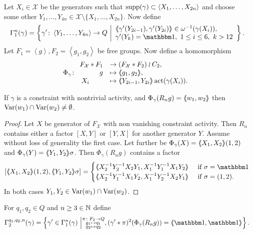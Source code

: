 \documentclass[a4paper,11pt]{amsart}
\begin{document}
 Let $X_i\in\mathcal{X}$ be the generators such that
 $\operatorname{{supp}}(\gamma) \subset \left<X_1,\dotsc,X_{2n}\right>$ and choose
 some other
 $Y_1,\dotsc,Y_{4n} \in\mathcal{X} \setminus \{X_1,\dotsc,X_{2n}\}$.
 Now define
  \[\Gamma_1^n(\gamma) = \left \{\gamma' 
  \colon \left< Y_1,\ldots ,Y_{4n}\right> \to Q \bigmid
  \begin{array}{l}
   \pair{\gamma'(Y_{2i-1}),\gamma'(Y_{2i})}\in \omega^{-1}(\gamma(X_i)),\ \\
   \gamma'(Y_k) = \id,\ 1\leq i\leq 6,\ k>12
    \end{array} \right\}.\]
 Let $F_1=\left<g\right>,F_2=\left<g_1,g_2\right>$ be free groups. 
 Now define a homomorphism  
 \[\Phi_{\gamma}\colon\begin{array}{rl} F_{\mathcal{X}}*F_1 &\to (F_{\mathcal{X}}*F_2)\wr C_2,\\ g&\mapsto \langle\negthickspace\langle g_1,g_2\rangle\negthickspace\rangle,\\ X_i\qquad &\mapsto \langle\negthickspace\langle Y_{2i-1},Y_{2i}\rangle\negthickspace\rangle\operatorname{act}(\gamma(X_i)).
 \end{array}\]
\begin{lem} \label{lem:commonVar}
 If $\gamma$ is a constraint with nontrivial activity, and $\Phi_\gamma(R_ng)=\langle\negthickspace\langle w_1,w_2\rangle\negthickspace\rangle$ 
 then $\textup{Var}(w_1)\cap\textup{Var}(w_2)\neq \emptyset$.
\end{lem}
\begin{proof}
 Let $X$ be generator of $F_{\mathcal{X}}$ with non vanishing constraint activity. 
 Then $R_n$ contains either a factor $[X,Y]$ or $[Y,X]$ for another generator $Y$. 
 Assume without loss of generality the first case. Let further be 
 $\Phi_\gamma(X)=\langle\negthickspace\langle X_1,X_2\rangle\negthickspace\rangle(1,2)$ and $\Phi_\gamma(Y)=\langle\negthickspace\langle Y_1,Y_2\rangle\negthickspace\rangle\sigma$. 
 Then $\Phi_\gamma(R_n g)$ contains a factor 
 \[ [\pair{X_1,X_2}(1,2),\pair{Y_1,Y_2}\sigma] = \begin{cases}
                                                   \pair{X_2^{-1}Y_2^{-1}X_2Y_1,X_1^{-1}Y_1^{-1}X_1Y_2} & \textup{ if } \sigma=\id \\
                                                   \pair{X_2^{-1}Y_1^{-1}X_1Y_2,X_1^{-1}Y_2^{-1}X_2Y_1} & \textup{ if } \sigma=(1,2) . \\
                                                 \end{cases}
\] In both cases $Y_1,Y_2\in \textup{Var}(w_1)\cap \textup{Var}(w_2)$. 
\end{proof}
For $q_1,q_2 \in Q$ and $n\geq3\in \mathbb{N}$ define
\[\Gamma_2^{q_1,q_2,n}(\gamma) = \left\{\gamma'\in \Gamma_1^n(\gamma) \bigmid \substack{\pi\colon F_2\to Q\\
      g_1\mapsto q_1 \\
      g_2\mapsto q_2 },
    (\gamma'*\pi)^2(\Phi_\gamma(R_ng))=\pair{\id,\id}\right\}.\]
\end{document}
